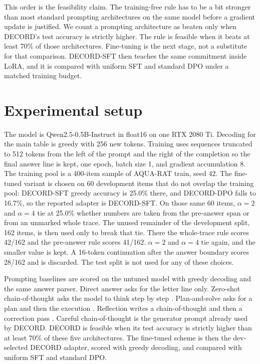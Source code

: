 \documentclass[11pt]{article}
\begin{document}
This order is the feasibility claim.
The training-free rule has to be a bit stronger than most standard prompting architectures on the same model before a gradient update is justified.
We count a prompting architecture as beaten only when DECORD's test accuracy is strictly higher.
The rule is feasible when it beats at least 70\% of those architectures.
Fine-tuning is the next stage, not a substitute for that comparison.
DECORD-SFT then teaches the same commitment inside LoRA, and it is compared with uniform SFT and standard DPO under a matched training budget.

\section{Experimental setup}

The model is Qwen2.5-0.5B-Instruct in float16 on one RTX 2080 Ti.
Decoding for the main table is greedy with 256 new tokens.
Training uses sequences truncated to 512 tokens from the left of the prompt and the right of the completion so the final answer line is kept, one epoch, batch size 1, and gradient accumulation 8.
The training pool is a 400-item sample of AQUA-RAT train, seed 42.
The fine-tuned variant is chosen on 60 development items that do not overlap the training pool: DECORD-SFT greedy accuracy is 25.0\% there, and DECORD-DPO falls to 16.7\%, so the reported adapter is DECORD-SFT.
On those same 60 items, \(\alpha=2\) and \(\alpha=4\) tie at 25.0\% whether numbers are taken from the pre-answer span or from an unmarked whole trace.
The unused remainder of the development split, 162 items, is then used only to break that tie.
There the whole-trace rule scores 42/162 and the pre-answer rule scores 41/162.
\(\alpha=2\) and \(\alpha=4\) tie again, and the smaller value is kept.
A 16-token continuation after the answer boundary scores 28/162 and is discarded.
The test split is not used for any of these choices.

Prompting baselines are scored on the untuned model with greedy decoding and the same answer parser.
Direct answer asks for the letter line only.
Zero-shot chain-of-thought asks the model to think step by step \citep{kojima2022zeroshot}.
Plan-and-solve asks for a plan and then the execution \citep{wang2023plan}.
Reflection writes a chain-of-thought and then a correction pass \citep{madaan2023selfrefine}.
Careful chain-of-thought is the generator prompt already used by DECORD.
DECORD is feasible when its test accuracy is strictly higher than at least 70\% of these five architectures.
The fine-tuned scheme is then the dev-selected DECORD adapter, scored with greedy decoding, and compared with uniform SFT and standard DPO.
\end{document}
